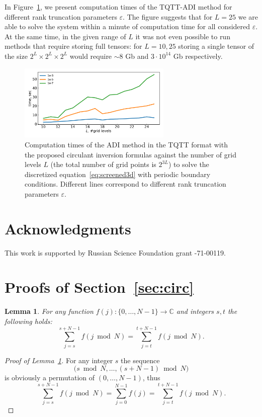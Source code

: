 \documentclass[a4paper]{article}
\newtheorem{lemma}{Lemma}[section]
\newcommand{\LL}{L}
\begin{document}
{In Figure~\ref{fig:3d_times}, we present computation times of the TQTT-ADI method for different rank truncation parameters $\varepsilon$.
The figure suggests that for $L=25$ we are able to solve the system within a minute of computation time for all considered $\varepsilon$.
At the same time, in the given range of $L$ it was not even possible to run methods that require storing full tensors: for $L=10, 25$ storing a single tensor of the size $2^{L}\times 2^L \times 2^L$ would require $\sim8$ Gb and $3\cdot 10^{14}$ Gb respectively.

\begin{figure}
    \centering
    \includegraphics[width=0.65\textwidth]{NLAA_rev1/times_3d.pdf}
    \caption{{\color{blue} Computation times of the ADI method in the TQTT format with the proposed circulant inversion formulas against the number of grid levels $\LL$ (the total number of grid points is $2^{3\LL}$) to solve the discretized equation~\eqref{eq:screened3d} with periodic boundary conditions.
    Different lines correspond to different  rank truncation parameters $\varepsilon$.}}
    \label{fig:3d_times}
\end{figure}
}

\section*{Acknowledgments}
This work is supported by Russian Science Foundation grant \textnumero{}-71-00119.









\appendix

\section{Proofs of Section~\ref{sec:circ}} \label{app:circ}

\begin{lemma}\label{lm:sum-shift}
	For any function $f(j):\{0,\dots,N-1\}\to \mathbb{C}$ and integers  $s,t$ the following holds:
	\[
	\sum_{j=s}^{s+N-1} f(j \bmod N) = \sum_{j=t}^{t+N-1} f(j \bmod N).
	\]
	\end{lemma}
\begin{proof}[Proof of Lemma~\ref{lm:sum-shift}]
For any integer $s$ the sequence 
	\[
	\Big(s \bmod N, \dots, (s+N-1) \bmod N\Big)
	\]
	is obviously a permutation of $(0,\dots, N-1)$, thus
	\[
	\sum_{j=s}^{s+N-1} f(j \bmod N) = \sum_{j=0}^{N-1} f(j) = \sum_{j=t}^{t+N-1} f(j \bmod N).
	\]
	\end{proof}
	
\end{document}
